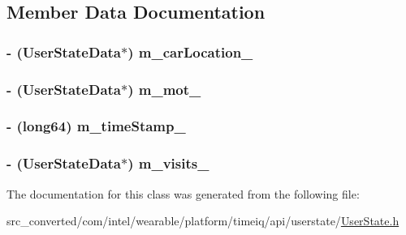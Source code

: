 \subsection{Member Data Documentation}
\hypertarget{interface_user_state_a6f4df56e77b3dba4241ca12d862d147a}{}
\subsubsection[{m\+\_\+car\+Location\+\_\+}]{\setlength{\rightskip}{0pt plus 5cm}-\/ ({\bf User\+State\+Data}$\ast$) m\+\_\+car\+Location\+\_\+}\label{interface_user_state_a6f4df56e77b3dba4241ca12d862d147a}
\hypertarget{interface_user_state_aa39ee1f018ba0d159d5eb5395482a356}{}
\subsubsection[{m\+\_\+mot\+\_\+}]{\setlength{\rightskip}{0pt plus 5cm}-\/ ({\bf User\+State\+Data}$\ast$) m\+\_\+mot\+\_\+}\label{interface_user_state_aa39ee1f018ba0d159d5eb5395482a356}
\hypertarget{interface_user_state_adb2239662f6c0ac35617b9a629e8938f}{}
\subsubsection[{m\+\_\+time\+Stamp\+\_\+}]{\setlength{\rightskip}{0pt plus 5cm}-\/ (long64) m\+\_\+time\+Stamp\+\_\+}\label{interface_user_state_adb2239662f6c0ac35617b9a629e8938f}
\hypertarget{interface_user_state_aa2d7c286570721957782376a23f7b462}{}
\subsubsection[{m\+\_\+visits\+\_\+}]{\setlength{\rightskip}{0pt plus 5cm}-\/ ({\bf User\+State\+Data}$\ast$) m\+\_\+visits\+\_\+}\label{interface_user_state_aa2d7c286570721957782376a23f7b462}


The documentation for this class was generated from the following file\+:\begin{DoxyCompactItemize}
\item 
src\+\_\+converted/com/intel/wearable/platform/timeiq/api/userstate/\hyperlink{_user_state_8h}{User\+State.\+h}\end{DoxyCompactItemize}
